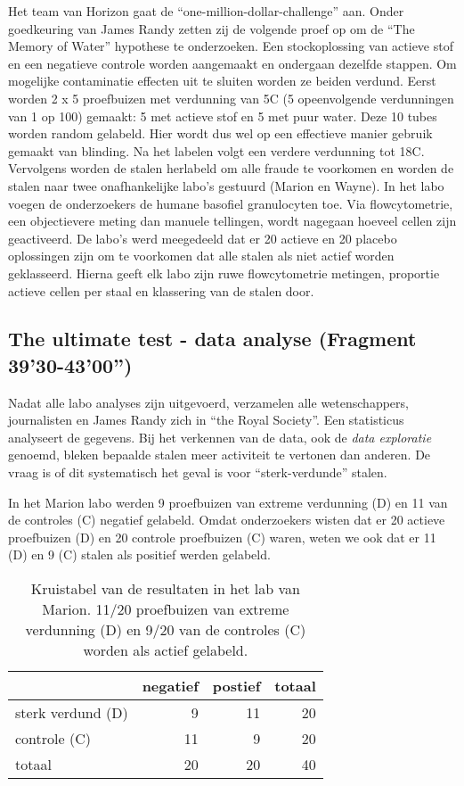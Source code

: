\documentclass[12pt,dutch,coursenotes]{book}
\theoremstyle{definition}
\theoremstyle{definition}
\theoremstyle{definition}
\theoremstyle{remark}
\begin{document}
Het team van Horizon gaat de ``one-million-dollar-challenge'' aan. Onder
goedkeuring van James Randy zetten zij de volgende proef op om de ``The
Memory of Water'' hypothese te onderzoeken. Een stockoplossing van
actieve stof en een negatieve controle worden aangemaakt en ondergaan
dezelfde stappen. Om mogelijke contaminatie effecten uit te sluiten
worden ze beiden verdund. Eerst worden 2 x 5 proefbuizen met verdunning
van 5C (5 opeenvolgende verdunningen van 1 op 100) gemaakt: 5 met
actieve stof en 5 met puur water. Deze 10 tubes worden random gelabeld.
Hier wordt dus wel op een effectieve manier gebruik gemaakt van
blinding. Na het labelen volgt een verdere verdunning tot 18C.
Vervolgens worden de stalen herlabeld om alle fraude te voorkomen en
worden de stalen naar twee onafhankelijke labo's gestuurd (Marion en
Wayne). In het labo voegen de onderzoekers de humane basofiel
granulocyten toe. Via flowcytometrie, een objectievere meting dan
manuele tellingen, wordt nagegaan hoeveel cellen zijn geactiveerd. De
labo's werd meegedeeld dat er 20 actieve en 20 placebo oplossingen zijn
om te voorkomen dat alle stalen als niet actief worden geklasseerd.
Hierna geeft elk labo zijn ruwe flowcytometrie metingen, proportie
actieve cellen per staal en klassering van de stalen door.

\subsection{The ultimate test - data analyse (Fragment
39'30-43'00'')}\label{the-ultimate-test---data-analyse-fragment-3930-4300}

Nadat alle labo analyses zijn uitgevoerd, verzamelen alle
wetenschappers, journalisten en James Randy zich in ``the Royal
Society''. Een statisticus analyseert de gegevens. Bij het verkennen van
de data, ook de \emph{data exploratie} genoemd, bleken bepaalde stalen
meer activiteit te vertonen dan anderen. De vraag is of dit systematisch
het geval is voor ``sterk-verdunde'' stalen.

In het Marion labo werden 9 proefbuizen van extreme verdunning (D) en 11
van de controles (C) negatief gelabeld. Omdat onderzoekers wisten dat er
20 actieve proefbuizen (D) en 20 controle proefbuizen (C) waren, weten
we ook dat er 11 (D) en 9 (C) stalen als positief werden gelabeld.

\begin{table}

\caption{\label{tab:kruistabelMarion}Kruistabel van de resultaten in het lab van Marion. 11/20 proefbuizen van extreme verdunning (D) en 9/20 van de controles (C) worden als actief gelabeld.}
\centering
\begin{tabular}[t]{lrrr}
\toprule
  & negatief & postief & totaal\\
\midrule
sterk verdund (D) & 9 & 11 & 20\\
controle (C) & 11 & 9 & 20\\
totaal & 20 & 20 & 40\\
\bottomrule
\end{tabular}
\end{table}
\end{document}
